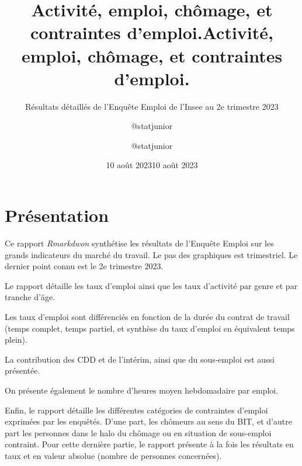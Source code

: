 \documentclass[
  paper=a4,
  ,captions=tableheading
]{scrartcl}
\title{Activité, emploi, chômage, et contraintes d'emploi.}
\subtitle{Résultats détaillés de l'Enquête Emploi de l'Insee au 2e
trimestre 2023}
\author{@statjunior}
\date{10 août 2023}
\title{Activité, emploi, chômage, et contraintes d'emploi.}
\author{@statjunior}
\date{10 août 2023}
\begin{document}
\begin{titlepage}
\afterpage{\restorepagecolor}
\newcommand{\colorRule}[3][black]{\textcolor[HTML]{#1}{\rule{#2}{#3}}}
\end{titlepage}
\restoregeometry
{} 




\hypertarget{pruxe9sentation}{%
\section{Présentation}\label{pruxe9sentation}}

Ce rapport \emph{Rmarkdwon} synthétise les résultats de l'Enquête Emploi
sur les grands indicateurs du marché du travail. Le pas des graphiques
est trimestriel. Le dernier point connu est le 2e trimestre 2023.

Le rapport détaille les taux d'emploi ainsi que les taux d'activité par
genre et par tranche d'âge.

Les taux d'emploi sont différenciés en fonction de la durée du contrat
de travail (temps complet, temps partiel, et synthèse du taux d'emploi
en équivalent temps plein).

La contribution des CDD et de l'intérim, ainsi que du sous-emploi est
aussi présentée.

On présente également le nombre d'heures moyen hebdomadaire par emploi.

Enfin, le rapport détaille les différentes catégories de contraintes
d'emploi exprimées par les enquêtés. D'une part, les chômeurs au sens du
BIT, et d'autre part les personnes dans le halo du chômage ou en
situation de sous-emploi contraint. Pour cette dernière partie, le
rapport présente à la fois les résultats en taux et en valeur absolue
(nombre de personnes concernées).
\end{document}
